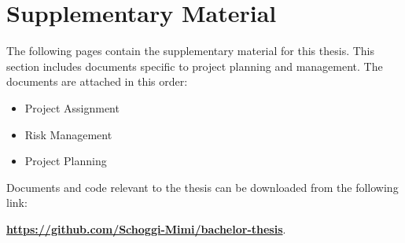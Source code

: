 \chapter{Supplementary Material}
\label{ch:Supplementary}

The following pages contain the supplementary material for this thesis. This section includes documents specific to project planning and management. The documents are attached in this order: \par

\begin{itemize}
    \item Project Assignment
    \item Risk Management
    \item Project Planning
\end{itemize}
Documents and code relevant to the thesis can be downloaded from the following link:\par 
\textbf{\url{https://github.com/Schoggi-Mimi/bachelor-thesis}}.



